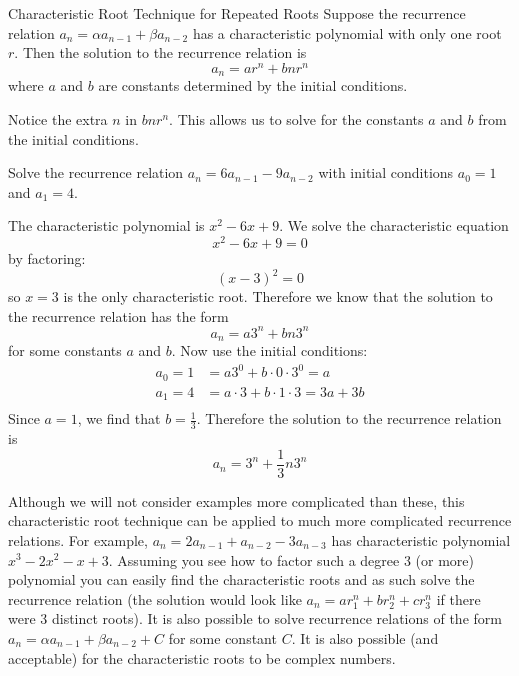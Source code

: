 \documentclass[12pt]{article}
\begin{document}
\begin{defbox}{Characteristic Root Technique for Repeated Roots}
 Suppose the recurrence relation $a_n = \alpha a_{n-1} + \beta a_{n-2}$ has a characteristic polynomial with only one root $r$.  Then the solution to the recurrence relation is
 \[a_n = ar^n + bnr^n\]
 where $a$ and $b$ are constants determined by the initial conditions.
\end{defbox}

Notice the extra $n$ in $bnr^n$.  This allows us to solve for the constants $a$ and $b$ from the initial conditions.

\begin{example}
 Solve the recurrence relation $a_n = 6a_{n-1} - 9a_{n-2}$ with initial conditions $a_0 = 1$ and $a_1 = 4$.  
 \begin{solution}
  The characteristic polynomial is $x^2 - 6x + 9$.  We solve the characteristic equation
  \[x^2 - 6x + 9 = 0\]
  by factoring:
  \[(x - 3)^2 = 0\]
  so $x =3$ is the only characteristic root.  Therefore we know that the solution to the recurrence relation has the form
  \[a_n = a 3^n + bn3^n\]
  for some constants $a$ and $b$.  Now use the initial conditions:
  \begin{align*}
   a_0 = 1 &= a 3^0 + b\cdot 0 \cdot 3^0 = a\\
   a_1 = 4 &= a\cdot 3 + b\cdot 1 \cdot3 = 3a + 3b\\
  \end{align*}
  Since $a = 1$, we find that $b = \frac{1}{3}$.  Therefore the solution to the recurrence relation is
  \[a_n = 3^n + \frac{1}{3}n3^n\]
 \end{solution}


 
\end{example}

 Although we will not consider examples more complicated than these, this characteristic root technique can be applied to much more complicated recurrence relations.  For example, $a_n = 2a_{n-1} + a_{n-2} - 3a_{n-3}$ has characteristic polynomial $x^3 - 2 x^2 - x + 3$.  Assuming you see how to factor such a degree 3 (or more) polynomial you can easily find the characteristic roots and as such solve the recurrence relation (the solution would look like $a_n = ar_1^n + br_2^n + cr_3^n$ if there were 3 distinct roots).  It is also possible to solve recurrence relations of the form $a_n = \alpha a_{n-1} + \beta a_{n-2} + C$ for some constant $C$.  It is also possible (and acceptable) for the characteristic roots to be complex numbers.
\end{document}
